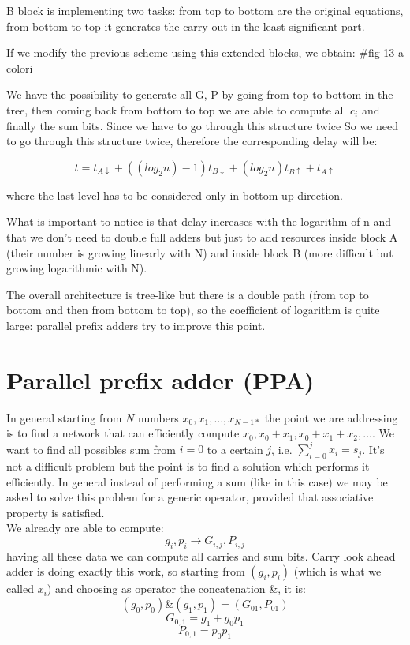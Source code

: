 B block is implementing two tasks: from top to bottom are the original equations, from bottom to top it generates the carry out in the least significant part.

If we modify the previous scheme using this extended blocks, we obtain:
\#fig 13 a colori

We have the possibility to generate all G, P by going from top to bottom in the tree, then coming back from bottom to top we are able to compute all $c_i$ and finally the sum bits. Since we have to go through this structure twice So we need to go through this structure twice, therefore the corresponding delay will be:

$$t=t_{A \downarrow} + ((log_2 n)-1) t_{B \downarrow} + (log_2n)t_{B \uparrow}+t_{A \uparrow}$$

where the last level has to be considered only in bottom-up direction.

What is important to notice is that delay increases with the logarithm of n and that we don't need to double full adders but just to add resources inside block A (their number is growing linearly with N) and inside block B (more difficult but growing logarithmic with N).

The overall architecture is tree-like but there is a double path (from top to bottom and then from bottom to top), so the coefficient of logarithm is quite large: parallel prefix adders try to improve this point.

\section{Parallel prefix adder (PPA)}

In general starting from $N$ numbers $x_0, x_1, ...,x_{N-1*}$ the point we are addressing is to find a network that can efficiently compute $x_0, x_0+x_1, x_0+x_1+x_2, ...$. We want to find all possibles sum from $i=0$ to a certain $j$, i.e. $\sum_{i=0}^{j} x_i=s_j$. It's not a difficult problem but the point is to find a solution which performs it efficiently. In general instead of performing a sum (like in this case) we may be asked to solve this problem for a generic operator, provided that associative property is satisfied.\\

We already are able to compute:
$$g_i, p_i \longrightarrow G_{i, j}, P_{i, j} $$
having all these data we can compute all carries and sum bits. Carry look ahead adder is doing exactly this work, so starting from $(g_i, p_i)$ (which is what we called $x_i$) and choosing as operator the concatenation \&, it is:
$$(g_0, p_0) \& (g_1, p_1)=(G_{01}, P_{01})$$
$$G_{0,1}=g_1+g_0p_1$$
$$P_{0,1}=p_0p_1$$

